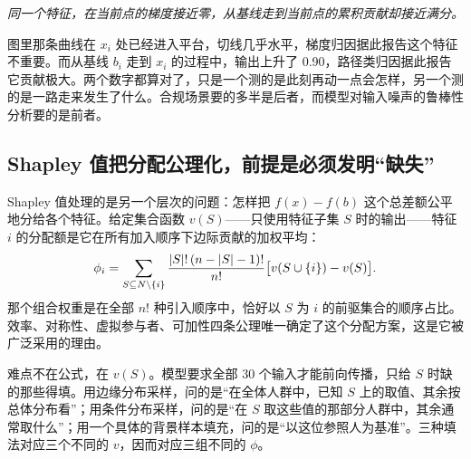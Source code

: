\begin{center}
\end{center}

\emph{同一个特征，在当前点的梯度接近零，从基线走到当前点的累积贡献却接近满分。}

图里那条曲线在 \(x_i\) 处已经进入平台，切线几乎水平，梯度归因据此报告这个特征不重要。而从基线 \(b_i\) 走到 \(x_i\) 的过程中，输出上升了 0.90，路径类归因据此报告它贡献极大。两个数字都算对了，只是一个测的是此刻再动一点会怎样，另一个测的是一路走来发生了什么。合规场景要的多半是后者，而模型对输入噪声的鲁棒性分析要的是前者。

\subsection{Shapley 值把分配公理化，前提是必须发明``缺失''}

Shapley 值处理的是另一个层次的问题：怎样把 \(f(x)-f(b)\) 这个总差额公平地分给各个特征。给定集合函数 \(v(S)\)——只使用特征子集 \(S\) 时的输出——特征 \(i\) 的分配额是它在所有加入顺序下边际贡献的加权平均：
\[
\phi_i=\sum_{S\subseteq N\setminus\{i\}}
\frac{\left|S\right|!\,(n-\left|S\right|-1)!}{n!}
\bigl[v(S\cup\{i\})-v(S)\bigr].
\]
那个组合权重是在全部 \(n!\) 种引入顺序中，恰好以 \(S\) 为 \(i\) 的前驱集合的顺序占比。效率、对称性、虚拟参与者、可加性四条公理唯一确定了这个分配方案，这是它被广泛采用的理由。

难点不在公式，在 \(v(S)\)。模型要求全部 30 个输入才能前向传播，只给 \(S\) 时缺的那些得填。用边缘分布采样，问的是``在全体人群中，已知 \(S\) 上的取值、其余按总体分布看''；用条件分布采样，问的是``在 \(S\) 取这些值的那部分人群中，其余通常取什么''；用一个具体的背景样本填充，问的是``以这位参照人为基准''。三种填法对应三个不同的 \(v\)，因而对应三组不同的 \(\phi\)。

